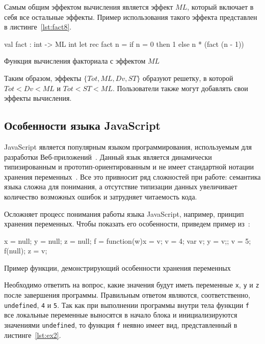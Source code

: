 \documentclass[12pt]{matmex-diploma}
\begin{document}
Самым общим эффектом вычисления является эффект $ML$, который включает в себя все остальные эффекты. Пример использования такого эффекта представлен в листинге~\ref{lst:fact8}.

\begin{listing}[H]
\begin{pyglist}[language=ocaml,numbers=none,numbersep=5pt, fontsize=\small]
val fact : int -> ML int 
let rec fact n =
    if n = 0 then 1 else n * (fact (n - 1)) 
\end{pyglist}
\caption{Функция вычисления факториала с эффектом $ML$}
\label{lst:fact8} 
\end{listing}

Таким образом, эффекты $\{Tot, ML, Dv, ST\}$ образуют решетку, в которой $Tot < Dv < ML$ и  $Tot < ST < ML$. Пользователи также могут добавлять свои эффекты вычисления. 

\subsection{Особенности языка JavaScript}

JavaScript является популярным языком программирования, используемым для разработки Веб-приложений~\cite{top10}. Данный язык является динамически типизированным и прототип-ориентированным и не имеет стандартной нотации хранения переменных~\cite{js_semantics}. Все это привносит ряд сложностей при работе: семантика языка сложна для понимания, а отсутствие типизации данных увеличивает количество возможных ошибок и затрудняет читаемость кода.

Осложняет процесс понимания работы языка JavaScript, например, принцип хранения переменных. Чтобы показать его особенности, приведем пример из~\cite{js_semantics}: 

\begin{listing}
\begin{pyglist}[language=javascript,numbers=none,numbersep=5pt, fontsize=\small]
    x = null; y = null; z = null;
    f = function(w){x = v; v = 4; var v; y = v;};
    v = 5; f(null); z = v;
\end{pyglist}
\caption{Пример функции, демонстрирующий особенности хранения переменных}
\label{lst:ex1} 
\end{listing}

Необходимо ответить на вопрос, какие значения будут иметь переменные \verb|x|, \verb|y| и \verb|z| после завершения программы. Правильным ответом являются, соответственно, \verb|undefined|, \verb|4| и \verb|5|. Так как при выполнении программы внутри тела функции \verb|f| все локальные переменные выносятся в начало блока и инициализируются значениями \verb|undefined|, то функция \verb|f| неявно имеет вид, представленный в листинге~\ref{lst:ex2}.
\end{document}
